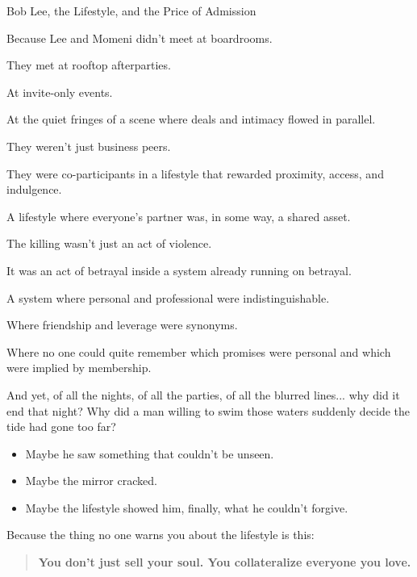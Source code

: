 \begin{HistoricalSidebar}{Bob Lee, the Lifestyle, and the Price of Admission}
  \medskip
  
  Because Lee and Momeni didn’t meet at boardrooms.

  \medskip
  
  They met at rooftop afterparties.

  \medskip
  
  At invite-only events.

  \medskip
  
  At the quiet fringes of a scene where deals and intimacy flowed in parallel.

  \medskip
  
  They weren’t just business peers.

  \medskip
  
  They were co-participants in a lifestyle that rewarded proximity, access, and indulgence.

  \medskip
  
  A lifestyle where everyone’s partner was, in some way, a shared asset.
  
  \medskip
  
  The killing wasn’t just an act of violence.

  \medskip
  
  It was an act of betrayal inside a system already running on betrayal.

  \medskip
  
  A system where personal and professional were indistinguishable.

  \medskip
  
  Where friendship and leverage were synonyms.

  \medskip
  
  Where no one could quite remember which promises were personal and which were implied by membership.
  
  \medskip
  
  And yet, of all the nights, of all the parties, of all the blurred lines... why did it end that night?  
  Why did a man willing to swim those waters suddenly decide the tide had gone too far?

  \medskip
  
  \begin{itemize}
    \item Maybe he saw something that couldn’t be unseen.
    \item Maybe the mirror cracked.
    \item Maybe the lifestyle showed him, finally,  what he couldn’t forgive.
  \end{itemize}

  \medskip
  
  Because the thing no one warns you about the lifestyle is this: 

  \begin{quote}
    \textbf{You don’t just sell your soul.  You collateralize everyone you love.}
  \end{quote}
  
\end{HistoricalSidebar}


